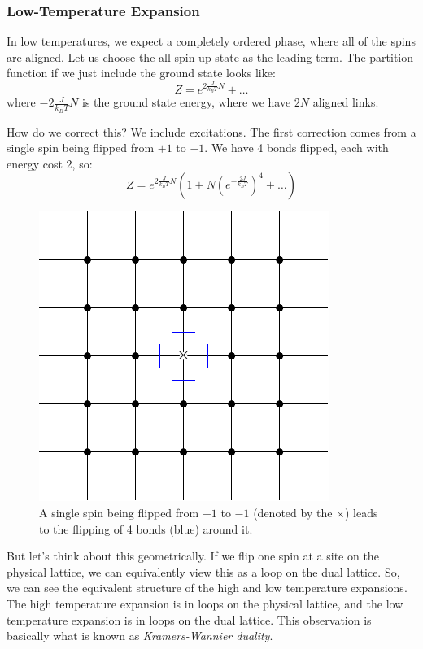 \subsubsection{Low-Temperature Expansion}
In low temperatures, we expect a completely ordered phase, where all of the spins are aligned. Let us choose the all-spin-up state as the leading term. The partition function if we just include the ground state looks like:
\begin{equation}
    Z = e^{2\frac{J}{k_B T}N} + \ldots
\end{equation}
where $-2\frac{J}{k_B T}N$ is the ground state energy, where we have $2N$ aligned links.

How do we correct this? We include excitations. The first correction comes from a single spin being flipped from $+1$ to $-1$. We have 4 bonds flipped, each with energy cost 2, so:
\begin{equation}
    Z = e^{2\frac{J}{k_B T}N}\left(1 + N\left(e^{-\frac{2J}{k_B T}}\right)^4 + \ldots \right)
\end{equation}

\begin{figure}[htbp]
    \centering
    \includegraphics{Images/fig-onespinflip.pdf}

    \caption{A single spin being flipped from $+1$ to $-1$ (denoted by the $\times$) leads to the flipping of 4 bonds (blue) around it.}
    \label{fig-onespinflip}
\end{figure}
But let's think about this geometrically. If we flip one spin at a site on the physical lattice, we can equivalently view this as a loop on the dual lattice. So, we can see the equivalent structure of the high and low temperature expansions. The high temperature expansion is in loops on the physical lattice, and the low temperature expansion is in loops on the dual lattice. This observation is basically what is known as \emph{Kramers-Wannier duality}.

